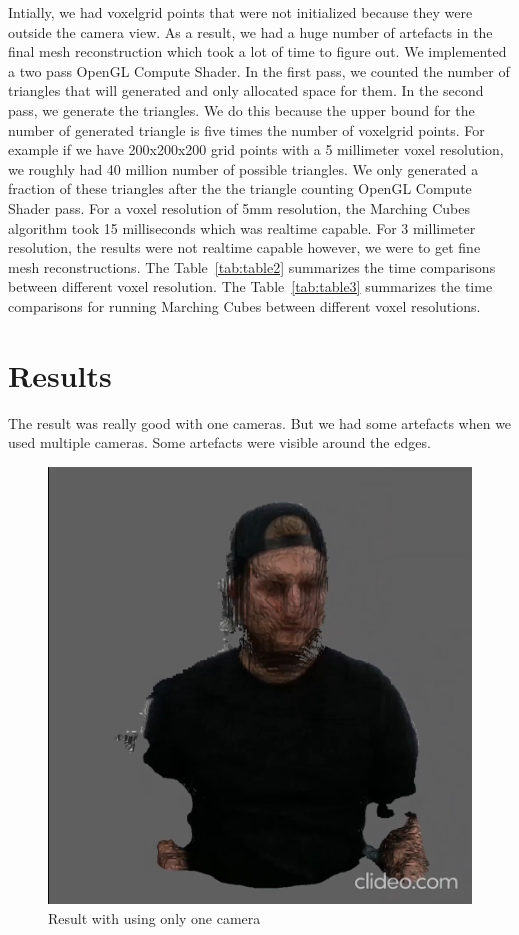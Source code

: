 \documentclass[10pt,twocolumn,letterpaper]{article}
\begin{document}
Intially, we had voxelgrid points that were not initialized because they were outside the camera view. As a result, we had a huge number of artefacts in the final mesh reconstruction which took a lot of time to figure out. We implemented a two pass OpenGL Compute Shader. In the first pass, we counted the number of triangles that will generated and only allocated space for them. In the second pass, we generate the triangles. We do this because the upper bound for the number of generated triangle is five times the number of voxelgrid points. For example if we have 200x200x200 grid points with a 5 millimeter voxel resolution, we roughly had 40 million number of possible triangles. We only generated a fraction of these triangles after the the triangle counting OpenGL Compute Shader pass. For a voxel resolution of 5mm resolution, the Marching Cubes algorithm took 15 milliseconds which was realtime capable. For 3 millimeter resolution, the results were not realtime capable however, we were to get fine mesh reconstructions.  The Table~\ref{tab:table2} summarizes the time comparisons between different voxel resolution. The Table~\ref{tab:table3} summarizes the time comparisons for running Marching Cubes between different voxel resolutions. 

\section{Results}
The result was really good with one cameras. But we had some artefacts when we used multiple cameras. Some artefacts were visible around the edges.

\begin{figure}[t]
\begin{center}
\includegraphics[width=0.65\linewidth]{imgs/res1}
\end{center}
 \caption{Result with using only one camera}
\end{figure}
\end{document}

